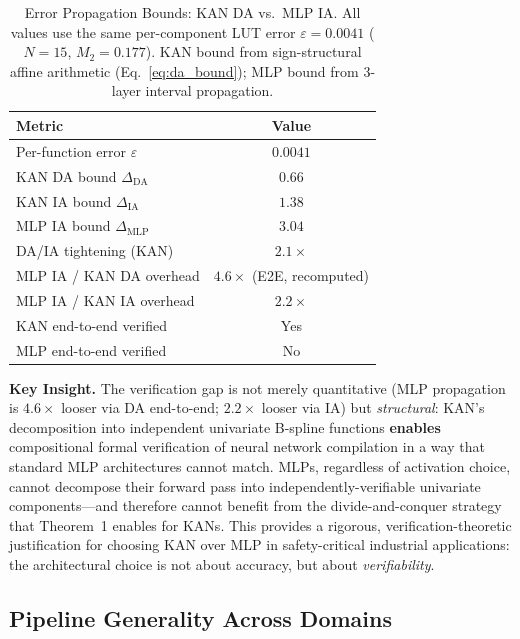 \documentclass[journal,onecolumn]{IEEEtran}
\begin{document}
\begin{table}[ht]
\centering
\caption{Error Propagation Bounds: KAN DA vs.\ MLP IA.
All values use the same per-component LUT error $\varepsilon = 0.0041$
($N{=}15$, $M_2{=}0.177$). KAN bound from sign-structural affine arithmetic
(Eq.~\ref{eq:da_bound}); MLP bound from 3-layer interval propagation.}
\label{tab:verify_gap_propagation}
\begin{tabular}{@{}lc@{}}
\toprule
\textbf{Metric} & \textbf{Value} \\
\midrule
 Per-function error $\varepsilon$            & $0.0041$ \\
 KAN DA bound $\Delta_{\text{DA}}$           & $0.66$ \\
 KAN IA bound $\Delta_{\text{IA}}$           & $1.38$ \\
 MLP IA bound $\Delta_{\text{MLP}}$          & $3.04$ \\
\midrule
 DA/IA tightening (KAN)                      & $2.1\times$ \\
 MLP IA / KAN DA overhead                    & $4.6\times$ (E2E, recomputed) \\
 MLP IA / KAN IA overhead                    & $2.2\times$ \\
 KAN end-to-end verified                     & Yes \\
 MLP end-to-end verified                     & No \\
\bottomrule
\end{tabular}
\end{table}

\vspace{4pt}
\noindent\textbf{Key Insight.} The verification gap is not merely
quantitative (MLP propagation is $4.6\times$ looser via DA end-to-end; $2.2\times$ looser via IA)
but \textit{structural}: KAN's decomposition into independent univariate
B-spline functions \textbf{enables} compositional formal verification of neural network compilation in a way that standard MLP architectures cannot match. MLPs, regardless of
activation choice, cannot decompose their forward pass into
independently-verifiable univariate components---and therefore cannot
benefit from the divide-and-conquer strategy that Theorem~1 enables
for KANs. This provides a rigorous, verification-theoretic justification
for choosing KAN over MLP in safety-critical industrial applications:
the architectural choice is not about accuracy, but about
\textit{verifiability}.

\subsection{Pipeline Generality Across Domains}
\label{sec:cross_domain}
\end{document}

